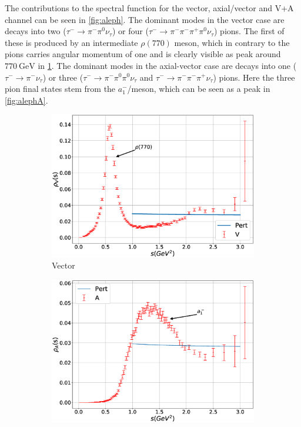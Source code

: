 \documentclass[../../index.tex]{subfiles}
\begin{document}
The contributions to the spectral function for the vector, axial\-/vector and
V+A channel can be seen in \cref{fig:aleph}. The dominant modes in the vector
case are \cite{Davier2006} decays into two (\(\tau^- \to \pi^-\pi^0 \nu_\tau\))
or four (\(\tau^- \to \pi^- \pi^- \pi^+ \pi^0 \nu_\tau\)) pions. The first of
these is produced by an intermediate \(\rho(770)\) meson, which in contrary to
the pions carries angular momentum of one and is clearly visible as peak around
\(\SI{770}{\giga\eV}\) in \cref{fig:alephV}. The dominant modes in the
axial-vector case are decays into one (\(\tau^-\to \pi^-\nu_\tau\)) or three
(\(\tau^-\to \pi^- \pi^0 \pi^0 \nu_\tau\) and \(\tau^- \to \pi^- \pi^-
\pi^+\nu_\tau\)) pions. Here the three pion final states stem from the
\(a_1^-\)\-/meson, which can be seen as a peak in \cref{fig:alephA}.
\begin{figure}
  \centering
  \begin{subfigure}[b]{0.49\textwidth}
    \includegraphics[width=\textwidth]{./images/specFuncAleph_V.eps}
    \caption{Vector}
    \label{fig:alephV}
  \end{subfigure}
  \begin{subfigure}[b]{0.49\textwidth}
    \includegraphics[width=\textwidth]{./images/specFuncAleph_A.eps}

\end{subfigure}
\end{figure}
\end{document}
